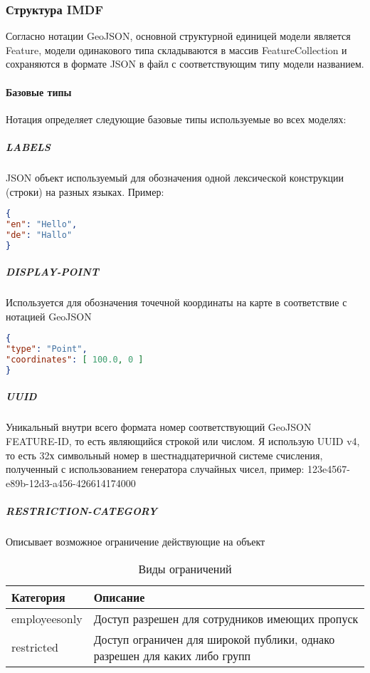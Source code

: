     \subsubsection{Структура IMDF}
      Согласно нотации GeoJSON, основной структурной единицей модели является Feature, модели одинакового типа складываются в массив FeatureCollection и сохраняются в формате JSON в файл с соответствующим типу модели названием.

      \paragraph{Базовые типы}
        Нотация определяет следующие базовые типы используемые во всех моделях:
        \subparagraph{LABELS}
          JSON объект используемый для обозначения одной лексической конструкции (строки) на разных языках. Пример:
          \begin{lstlisting}[language=json,caption={Пример модели LABELS}]
{
"en": "Hello",
"de": "Hallo"
}
          \end{lstlisting}

        \subparagraph{DISPLAY-POINT}
          Используется для обозначения точечной координаты на карте в соответствие с нотацией GeoJSON
          \begin{lstlisting}[language=json,caption={Пример модели DISPLAY-POINT}]
{
"type": "Point",
"coordinates": [ 100.0, 0 ]
}
          \end{lstlisting}

        \subparagraph{UUID}
          Уникальный внутри всего формата номер соответствующий GeoJSON FEATURE-ID, то есть являющийся строкой или числом.
          Я использую UUID v4, то есть 32х символьный номер в шестнадцатеричной системе счисления, полученный с использованием генератора случайных чисел, пример: 123e4567-e89b-12d3-a456-426614174000

        \subparagraph{RESTRICTION-CATEGORY}
          Описывает возможное ограничение действующие на объект
          \begin{center}
            \begin{xltabular}{\linewidth}{|l|X|}
              \caption{Виды ограничений}\\\hline
              Категория     & Описание                                                                   \\\hline
              employeesonly & Доступ разрешен для сотрудников имеющих пропуск                            \\\hline
              restricted    & Доступ ограничен для широкой публики, однако разрешен для каких либо групп \\\hline
            \end{xltabular}
          \end{center}


